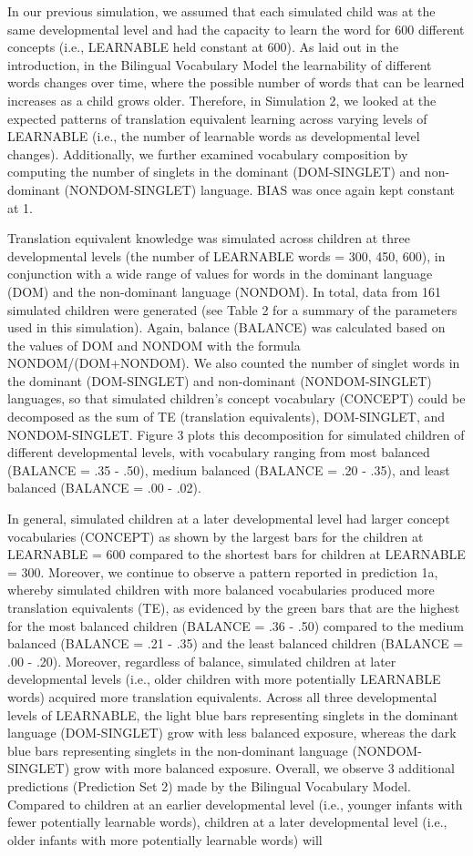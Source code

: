 \documentclass[
  english,
  ,man,floatsintext]{apa6}
\begin{document}
In our previous simulation, we assumed that each simulated child was at the same developmental level and had the capacity to learn the word for 600 different concepts (i.e., LEARNABLE held constant at 600). As laid out in the introduction, in the Bilingual Vocabulary Model the learnability of different words changes over time, where the possible number of words that can be learned increases as a child grows older. Therefore, in Simulation 2, we looked at the expected patterns of translation equivalent learning across varying levels of LEARNABLE (i.e., the number of learnable words as developmental level changes). Additionally, we further examined vocabulary composition by computing the number of singlets in the dominant (DOM-SINGLET) and non-dominant (NONDOM-SINGLET) language. BIAS was once again kept constant at 1.

Translation equivalent knowledge was simulated across children at three developmental levels (the number of LEARNABLE words = 300, 450, 600), in conjunction with a wide range of values for words in the dominant language (DOM) and the non-dominant language (NONDOM). In total, data from 161 simulated children were generated (see Table 2 for a summary of the parameters used in this simulation). Again, balance (BALANCE) was calculated based on the values of DOM and NONDOM with the formula NONDOM/(DOM+NONDOM). We also counted the number of singlet words in the dominant (DOM-SINGLET) and non-dominant (NONDOM-SINGLET) languages, so that simulated children's concept vocabulary (CONCEPT) could be decomposed as the sum of TE (translation equivalents), DOM-SINGLET, and NONDOM-SINGLET. Figure 3 plots this decomposition for simulated children of different developmental levels, with vocabulary ranging from most balanced (BALANCE = .35 - .50), medium balanced (BALANCE = .20 - .35), and least balanced (BALANCE = .00 - .02).

In general, simulated children at a later developmental level had larger concept vocabularies (CONCEPT) as shown by the largest bars for the children at LEARNABLE = 600 compared to the shortest bars for children at LEARNABLE = 300. Moreover, we continue to observe a pattern reported in prediction 1a, whereby simulated children with more balanced vocabularies produced more translation equivalents (TE), as evidenced by the green bars that are the highest for the most balanced children (BALANCE = .36 - .50) compared to the medium balanced (BALANCE = .21 - .35) and the least balanced children (BALANCE = .00 - .20). Moreover, regardless of balance, simulated children at later developmental levels (i.e., older children with more potentially LEARNABLE words) acquired more translation equivalents. Across all three developmental levels of LEARNABLE, the light blue bars representing singlets in the dominant language (DOM-SINGLET) grow with less balanced exposure, whereas the dark blue bars representing singlets in the non-dominant language (NONDOM-SINGLET) grow with more balanced exposure. Overall, we observe 3 additional predictions (Prediction Set 2) made by the Bilingual Vocabulary Model. Compared to children at an earlier developmental level (i.e., younger infants with fewer potentially learnable words), children at a later developmental level (i.e., older infants with more potentially learnable words) will
\end{document}
